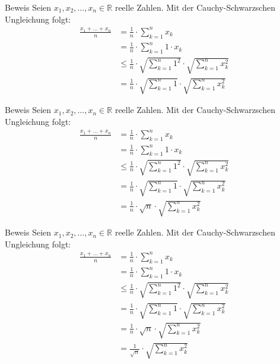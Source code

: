 \documentclass[10pt]{beamer}
\def\bR{\mathbb{R}}
\begin{document}
\begin{frame}{Beweis}
    Seien \( x_{1}, x_{2}, \ldots, x_{n} \in \bR \) reelle Zahlen. Mit der Cauchy-Schwarzschen Ungleichung folgt:
    \begin{align*}
        \frac{x_{1} + \ldots + x_{n}}{n} 
        & = \frac{1}{n} \cdot \sum_{k = 1}^{n} x_{k} \\
        & = \frac{1}{n} \cdot \sum_{k = 1}^{n} 1 \cdot x_{k} \\
        & \leq \frac{1}{n} \cdot \sqrt{\sum_{k = 1}^{n} 1^{2}} \cdot \sqrt{\sum_{k = 1}^{n} x_{k}^{2}} \\
        & = \frac{1}{n} \cdot \sqrt{\sum_{k = 1}^{n} 1} \cdot \sqrt{\sum_{k = 1}^{n} x_{k}^{2}}
    \end{align*}
\end{frame}



\begin{frame}{Beweis}
    Seien \( x_{1}, x_{2}, \ldots, x_{n} \in \bR \) reelle Zahlen. Mit der Cauchy-Schwarzschen Ungleichung folgt:
    \begin{align*}
        \frac{x_{1} + \ldots + x_{n}}{n} 
        & = \frac{1}{n} \cdot \sum_{k = 1}^{n} x_{k} \\
        & = \frac{1}{n} \cdot \sum_{k = 1}^{n} 1 \cdot x_{k} \\
        & \leq \frac{1}{n} \cdot \sqrt{\sum_{k = 1}^{n} 1^{2}} \cdot \sqrt{\sum_{k = 1}^{n} x_{k}^{2}} \\
        & = \frac{1}{n} \cdot \sqrt{\sum_{k = 1}^{n} 1} \cdot \sqrt{\sum_{k = 1}^{n} x_{k}^{2}} \\
        & = \frac{1}{n} \cdot \sqrt{n} \cdot \sqrt{\sum_{k = 1}^{n} x_{k}^{2}}
    \end{align*}
\end{frame}



\begin{frame}{Beweis}
    Seien \( x_{1}, x_{2}, \ldots, x_{n} \in \bR \) reelle Zahlen. Mit der Cauchy-Schwarzschen Ungleichung folgt:
    \begin{align*}
        \frac{x_{1} + \ldots + x_{n}}{n} 
        & = \frac{1}{n} \cdot \sum_{k = 1}^{n} x_{k} \\
        & = \frac{1}{n} \cdot \sum_{k = 1}^{n} 1 \cdot x_{k} \\
        & \leq \frac{1}{n} \cdot \sqrt{\sum_{k = 1}^{n} 1^{2}} \cdot \sqrt{\sum_{k = 1}^{n} x_{k}^{2}} \\
        & = \frac{1}{n} \cdot \sqrt{\sum_{k = 1}^{n} 1} \cdot \sqrt{\sum_{k = 1}^{n} x_{k}^{2}} \\
        & = \frac{1}{n} \cdot \sqrt{n} \cdot \sqrt{\sum_{k = 1}^{n} x_{k}^{2}} \\
        & = \frac{1}{\sqrt{n}} \cdot \sqrt{\sum_{k = 1}^{n} x_{k}^{2}}
    \end{align*}
\end{frame}
\end{document}

